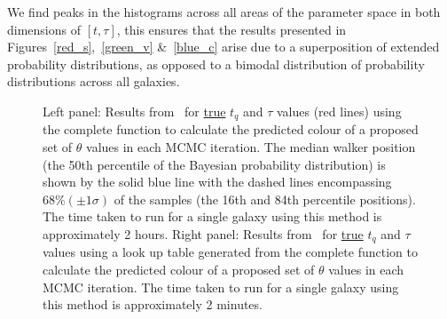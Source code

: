 We find peaks in the histograms across all areas of the parameter space in both dimensions of $[t, \tau]$, this ensures that the results presented in Figures~\ref{red_s},~\ref{green_v} \&~\ref{blue_c} arise due to a superposition of extended probability distributions, as opposed to a bimodal distribution of probability distributions across all galaxies.


\begin{figure}
\caption{Left panel: Results from \starpy ~for \underline{true} $t_q$ and $\tau$ values (red lines) using the complete function to calculate the predicted colour of a proposed set of $\theta$ values in each MCMC iteration. The median walker position (the 50th percentile of the Bayesian probability distribution) is shown by the solid blue line with the dashed lines encompassing $68\% (\pm 1\sigma)$ of the samples (the 16th and 84th percentile positions). The time taken to run for a single galaxy using this method is approximately 2 hours. Right panel: Results from \starpy ~for \underline{true} $t_q$ and $\tau$ values using a look up table generated from the complete function to calculate the predicted colour of a proposed set of $\theta$ values in each MCMC iteration. The time taken to run for a single galaxy using this method is approximately 2 minutes.}
\label{lookup}
\end{figure}


